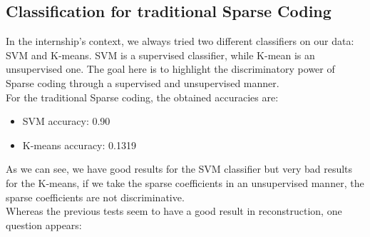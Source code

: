 \subsection{Classification for traditional Sparse Coding}
In the internship's context, we always tried two different classifiers on our data: SVM and K-means. 
SVM is a supervised classifier, while K-mean is an unsupervised one. The goal here is to highlight the discriminatory power of Sparse coding through a supervised and unsupervised manner.\\
For the traditional Sparse coding, the obtained accuracies are:
\begin{itemize}
 \item SVM accuracy: 0.90 
 \item K-means accuracy: 0.1319
\end{itemize}
As we can see, we have good results for the SVM classifier but very bad results for the K-means, if we take the sparse coefficients in an unsupervised manner, the sparse coefficients are not discriminative.\\

Whereas the previous tests seem to have a good result in reconstruction, one question appears: \\

